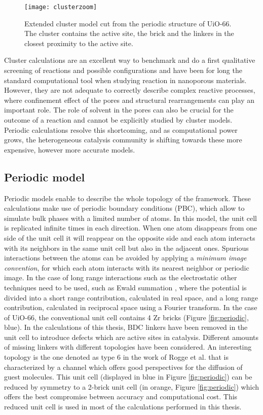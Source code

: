 \begin{figure}[!htbp]
	\centering
 	\texttt{[image: clusterzoom]}
	\caption{Extended cluster model cut from the periodic structure of UiO-66. The cluster contains the active site, the brick and the linkers in the closest proximity to the active site.}
	\label{fig:clusterzoom}
\end{figure}

Cluster calculations are an excellent way to benchmark and do a first qualitative screening of reactions and possible configurations and have been for long the standard computational tool when studying reaction in nanoporous materials. However, they are not adequate to correctly describe complex reactive processes, where confinement effect of the pores and structural rearrangements can play an important role. The role of solvent in the pores can also be crucial for the outcome of a reaction and cannot be explicitly studied by cluster models. Periodic calculations resolve this shortcoming, and as computational power grows, the heterogeneous catalysis community is shifting towards these more expensive, however more accurate models. 

\subsection{Periodic model}
Periodic models enable to describe the whole topology of the framework. These calculations make use of periodic boundary conditions (PBC), which allow to simulate bulk phases with a limited number of atoms. In this model, the unit cell is replicated infinite times in each direction. When one atom disappears from one side of the unit cell it will reappear on the opposite side and each atom interacts with its neighbors in the same unit cell but also in the adjacent ones. Spurious interactions between the atoms can be avoided by applying a \textit{minimum image convention}, for which each atom interacts with its nearest neighbor or periodic image. In the case of long range interactions such as the electrostatic other techniques need to be used, such as Ewald summation \cite{Ewald1921}, where the potential is divided into a short range contribution, calculated in real space, and a long range contribution, calculated in reciprocal space using a Fourier transform. 
In the case of UiO-66, the conventional unit cell\cite{cavka2008new} contains 4 Zr bricks (Figure \ref{fig:periodic}, blue). In the calculations of this thesis, BDC linkers have been removed in the unit cell to introduce defects which are active sites in catalysis. Different amounts of missing linkers with different topologies have been considered. An interesting topology is the one denoted as type 6 in the work of Rogge et al.\cite{rogge2017metal} that is characterized by a channel which offers good perspectives for the diffusion of guest molecules. This unit cell (displayed in blue in Figure \ref{fig:periodic}) can be reduced by symmetry to a 2-brick unit cell (in orange, Figure \ref{fig:periodic}) which offers the best compromise between accuracy and computational cost. This reduced unit cell is used in most of the calculations performed in this thesis.

